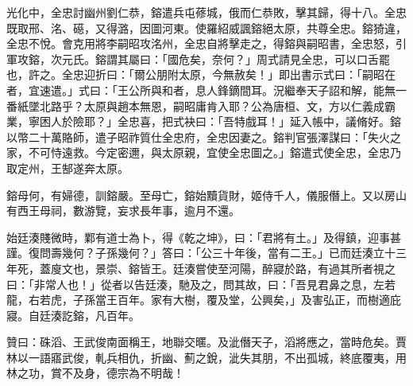 \begin{pinyinscope}
 光化中，全忠討幽州劉仁恭，鎔遣兵屯蓚城，俄而仁恭敗，擊其歸，得十八。全忠既取邢、洺、礠，又得潞，因圖河東。使羅紹威諷鎔絕太原，共尊全忠。鎔猗違，全忠不悅。會克用將李嗣昭攻洺州，全忠自將擊走之，得鎔與嗣昭書，全忠怒，引軍攻鎔，次元氏。鎔謂其屬曰：「國危矣，奈何？」周式請見全忠，可以口舌罷也，許之。全忠迎折曰：「爾公朋附太原，今無赦矣！」即出書示式曰：「嗣昭在者，宜速遣。」式曰：「王公所與和者，息人鋒鏑間耳。況繼奉天子詔和解，能無一番紙墜北路乎？太原與趙本無恩，嗣昭庸肯入耶？公為唐桓、文，方以仁義成霸業，寧困人於險耶？」全忠喜，把式袂曰：「吾特戲耳！」延入帳中，議脩好。鎔以幣二十萬賂師，遣子昭祚質仕全忠府，全忠因妻之。鎔判官張澤謀曰：「失火之家，不可恃遠救。今定密邇，與太原親，宜使全忠圖之。」鎔遣式使全忠，全忠乃取定州，王郜遂奔太原。



 鎔母何，有婦德，訓鎔嚴。至母亡，鎔始黷貨財，姬侍千人，儀服僭上。又以房山有西王母祠，數游覽，妄求長年事，逾月不還。



 始廷湊賤微時，鄴有道士為卜，得《乾之坤》，曰：「君將有土。」及得鎮，迎事甚謹。復問壽幾何？子孫幾何？」答曰：「公三十年後，當有二王。」已而廷湊立十三年死，蓋廋文也，景崇、鎔皆王。廷湊嘗使至河陽，醉寢於路，有過其所者視之曰：「非常人也！」從者以告廷湊，馳及之，問其故，曰：「吾見君鼻之息，左若龍，右若虎，子孫當王百年。家有大樹，覆及堂，公興矣，」及害弘正，而樹適庇寢。自廷湊訖鎔，凡百年。



 贊曰：硃滔、王武俊南面稱王，地聯交暱。及泚僭天子，滔將應之，當時危矣。賈林以一語寤武俊，軋兵相仇，折幽、薊之銳，泚失其朋，不出孤城，終底覆夷，用林之功，賞不及身，德宗為不明哉！



\end{pinyinscope}